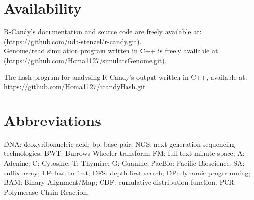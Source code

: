 \documentclass[11pt,a4paper]{report}
\begin{document}
\section{Availability}

R-Candy's documentation and source code are freely available at:\\
 (https://github.com/udo-stenzel/r-candy.git).
\\

Genome/read simulation program written in C++ is freely available at\\ 
(https://github.com/Homa1127/simulateGenome.git).


The hash program for analysing  R-Candy's output written in C++, available at: \\
https://github.com/Homa1127/rcandyHash.git


\section{Abbreviations}

DNA: deoxyribonucleic acid;
bp: base pair;
NGS: next generation sequencing technologies;
BWT: Burrows-Wheeler transform;
FM: full-text minute-space;
A: Adenine;
C: Cytosine;
T: Thymine;
G: Guanine;
PacBio: Pacific Bioscience;
SA: suffix array;
LF: last to first;
DFS: depth first search;
DP: dynamic programming;
BAM: Binary Alignment/Map;
CDF: cumulative distribution function.
PCR: Polymerase Chain Reaction.




\end{document}

